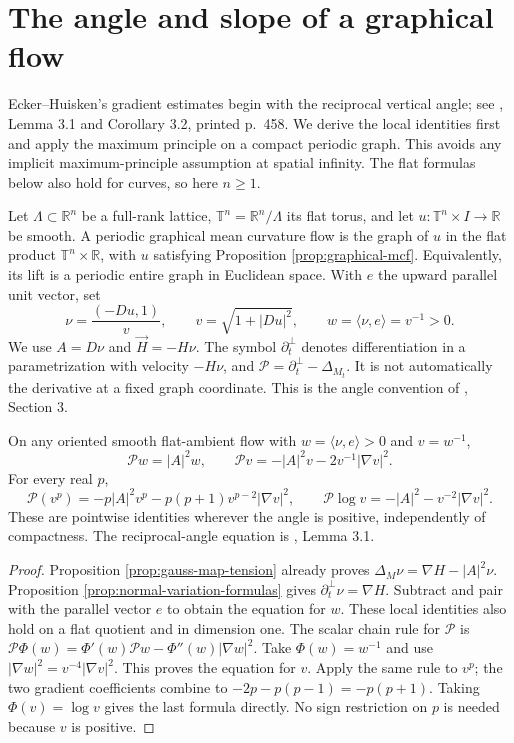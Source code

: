 \chapter{The angle and slope of a graphical flow}\label{sec:graphical-flow-angle}
Ecker--Huisken's gradient estimates begin with the reciprocal vertical angle; see \cite{EH89}, Lemma 3.1 and Corollary 3.2, printed p.~458. We derive the local identities first and apply the maximum principle on a compact periodic graph. This avoids any implicit maximum-principle assumption at spatial infinity. The flat formulas below also hold for curves, so here $n\geq1$.

\begin{definition}\label{def:periodic-graph-flow}
Let $\Lambda\subset\mathbb R^n$ be a full-rank lattice, $\mathbb T^n=\mathbb R^n/\Lambda$ its flat torus, and let $u:\mathbb T^n\times I\to\mathbb R$ be smooth. A periodic graphical mean curvature flow is the graph of $u$ in the flat product $\mathbb T^n\times\mathbb R$, with $u$ satisfying Proposition \ref{prop:graphical-mcf}. Equivalently, its lift is a periodic entire graph in Euclidean space. With $e$ the upward parallel unit vector, set
\[
 \nu=\frac{(-Du,1)}{v},\qquad v=\sqrt{1+|Du|^2},\qquad w=\langle\nu,e\rangle=v^{-1}>0.
\]
We use $A=D\nu$ and $\vec H=-H\nu$. The symbol $\partial_t^\perp$ denotes differentiation in a parametrization with velocity $-H\nu$, and $\mathcal P=\partial_t^\perp-\Delta_{M_t}$. It is not automatically the derivative at a fixed graph coordinate. This is the angle convention of \cite{EH89}, Section 3.
\end{definition}

\begin{proposition}\label{prop:graphical-angle-evolution}
On any oriented smooth flat-ambient flow with $w=\langle\nu,e\rangle>0$ and $v=w^{-1}$,
\[
 \mathcal Pw=|A|^2w,\qquad
 \mathcal Pv=-|A|^2v-2v^{-1}|\nabla v|^2.
\]
For every real $p$,
\[
 \mathcal P(v^p)=-p|A|^2v^p-p(p+1)v^{p-2}|\nabla v|^2,
 \qquad
 \mathcal P\log v=-|A|^2-v^{-2}|\nabla v|^2.
\]
These are pointwise identities wherever the angle is positive, independently of compactness. The reciprocal-angle equation is \cite{EH89}, Lemma 3.1.
\end{proposition}
\begin{proof}
Proposition \ref{prop:gauss-map-tension} already proves $\Delta_M\nu=\nabla H-|A|^2\nu$. Proposition \ref{prop:normal-variation-formulas} gives $\partial_t^\perp\nu=\nabla H$. Subtract and pair with the parallel vector $e$ to obtain the equation for $w$. These local identities also hold on a flat quotient and in dimension one. The scalar chain rule for $\mathcal P$ is
$\mathcal P\Phi(w)=\Phi'(w)\mathcal Pw-\Phi''(w)|\nabla w|^2$.
Take $\Phi(w)=w^{-1}$ and use $|\nabla w|^2=v^{-4}|\nabla v|^2$. This proves the equation for $v$. Apply the same rule to $v^p$; the two gradient coefficients combine to $-2p-p(p-1)=-p(p+1)$. Taking $\Phi(v)=\log v$ gives the last formula directly. No sign restriction on $p$ is needed because $v$ is positive.
\end{proof}

